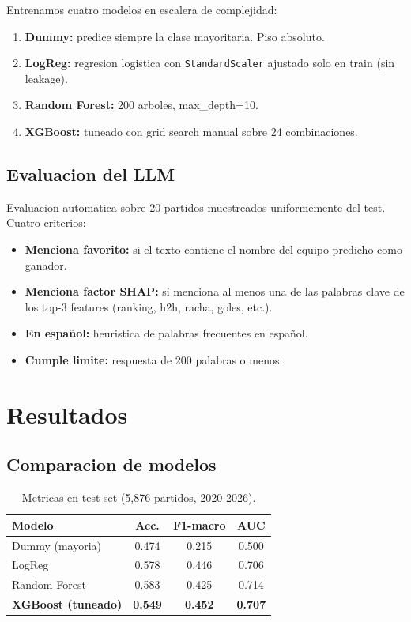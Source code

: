 \documentclass[10pt,twocolumn]{article}
\begin{document}
Entrenamos cuatro modelos en escalera de complejidad:

\begin{enumerate}[leftmargin=*,topsep=2pt,itemsep=1pt]
  \item \textbf{Dummy:} predice siempre la clase mayoritaria. Piso absoluto.
  \item \textbf{LogReg:} regresion logistica con \texttt{StandardScaler} ajustado solo en train (sin leakage).
  \item \textbf{Random Forest:} 200 arboles, max\_depth=10.
  \item \textbf{XGBoost:} tuneado con grid search manual sobre 24 combinaciones.
\end{enumerate}

\subsection{Evaluacion del LLM}

Evaluacion automatica sobre 20 partidos muestreados uniformemente del test. Cuatro criterios:

\begin{itemize}[leftmargin=*,topsep=2pt,itemsep=1pt]
  \item \textbf{Menciona favorito:} si el texto contiene el nombre del equipo predicho como ganador.
  \item \textbf{Menciona factor SHAP:} si menciona al menos una de las palabras clave de los top-3 features (ranking, h2h, racha, goles, etc.).
  \item \textbf{En español:} heuristica de palabras frecuentes en español.
  \item \textbf{Cumple limite:} respuesta de 200 palabras o menos.
\end{itemize}

\section{Resultados}
\label{sec:res}

\subsection{Comparacion de modelos}

\begin{table}[H]
\centering
\caption{Metricas en test set (5,876 partidos, 2020-2026).}
\label{tab:resultados}
\begin{tabular}{lccc}
\toprule
\textbf{Modelo} & \textbf{Acc.} & \textbf{F1-macro} & \textbf{AUC} \\
\midrule
Dummy (mayoria)            & 0.474 & 0.215 & 0.500 \\
LogReg                     & 0.578 & 0.446 & 0.706 \\
Random Forest              & 0.583 & 0.425 & 0.714 \\
\textbf{XGBoost (tuneado)} & \textbf{0.549} & \textbf{0.452} & \textbf{0.707} \\
\bottomrule
\end{tabular}
\end{table}
\end{document}

